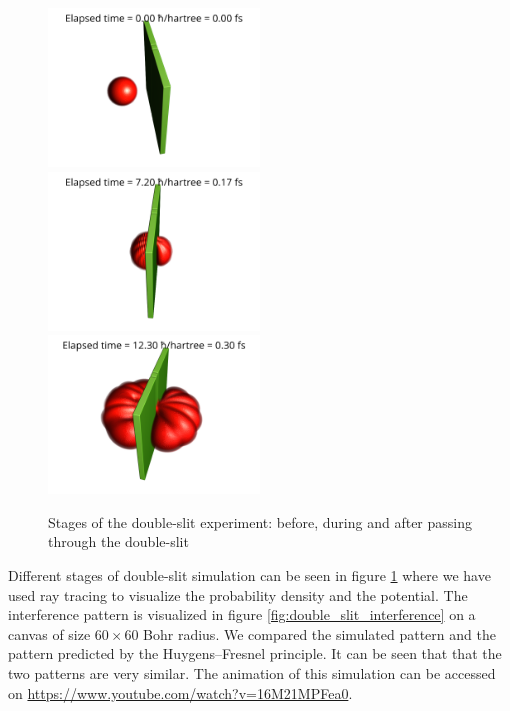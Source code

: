 \begin{figure}
	\begin{center}
		\includegraphics[width=0.5\textwidth]{figures/double_slit_01.png}
		\includegraphics[width=0.5\textwidth]{figures/double_slit_02.png}
		\includegraphics[width=0.5\textwidth]{figures/double_slit_03.png}
		\caption{Stages of the double-slit experiment: before, during and after passing through the double-slit}
		\label{fig:double_slit_stages}
	\end{center}
\end{figure}
Different stages of double-slit simulation can be seen in figure \ref{fig:double_slit_stages} where we have used ray tracing to visualize the probability density and the potential.
The interference pattern is visualized in figure \ref{fig:double_slit_interference} on a canvas of size $60 \times 60$ Bohr radius.
We compared the simulated pattern and the pattern predicted by the Huygens–Fresnel principle.
It can be seen that that the two patterns are very similar.
The animation of this simulation can be accessed on \url{https://www.youtube.com/watch?v=16M21MPFea0}.

